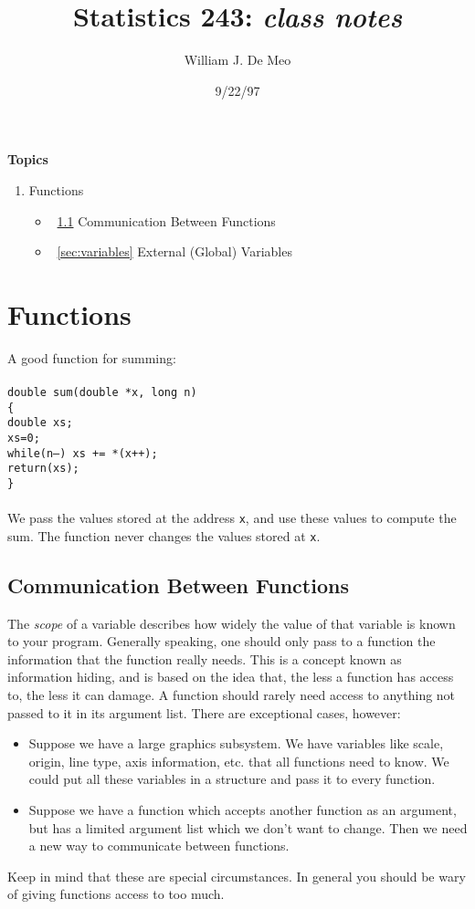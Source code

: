 \documentclass{article}
\begin{document}
\title{Statistics 243: \emph{class notes}}
\author{William J. De Meo}
\date{9/22/97}
\maketitle
{\bf Topics}
\begin{enumerate}
\item Functions
\begin{itemize}
\item ~\ref{sec:communication} Communication Between Functions
\item ~\ref{sec:variables} External (Global) Variables
\end{itemize}
\end{enumerate}

\section{Functions}
A good function for summing:\\\\
{\tt double sum(double *x, long n)\\
\{\\ 
double xs;\\
xs=0;\\
while(n--) xs += *(x++);\\
return(xs);\\
\}}\\
\\
We pass the values stored at the address {\tt x}, and use these values
to compute the sum.  The function never changes the values stored at {\tt x}.

\subsection{Communication Between Functions}
\label{sec:communication}

The \emph{scope} of a variable describes how widely the value of that variable 
is known to your program.  Generally speaking, one should only pass to a function the
information that the function really needs.  This is a concept known
as information hiding, and is based on the idea that, the less a
function has access to, the less it can damage.  A function should 
rarely need access to anything not passed to it in its argument list.
There are exceptional cases, however:  
\begin{itemize}
\item Suppose we have a large graphics subsystem.
We have variables like scale, origin, line type, axis information, etc. that
all functions need to know.  We could put all these variables in a structure 
and pass it to every function.
\item Suppose we have a function which accepts another function as an argument, but
has a limited argument list which we don't want to change.  Then we need a
new way to communicate between functions. 
\end{itemize}
Keep in mind that these are special circumstances.  In general you should be 
wary of giving functions access to too much.
\end{document}

